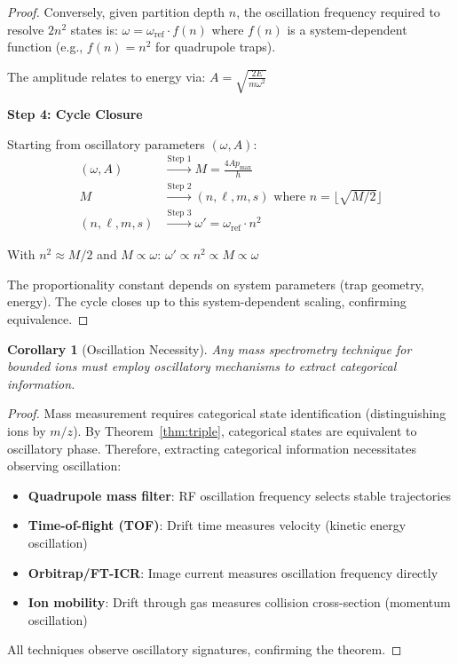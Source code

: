 \documentclass[twocolumn,10pt]{article}
\newtheorem{corollary}[theorem]{Corollary}
\begin{document}
\begin{proof}
Conversely, given partition depth $n$, the oscillation frequency required to resolve $2n^2$ states is:
$
\omega = \omega_{\mathrm{ref}} \cdot f(n)
$
where $f(n)$ is a system-dependent function (e.g., $f(n) = n^2$ for quadrupole traps).

The amplitude relates to energy via:
$
A = \sqrt{\frac{2E}{m\omega^2}}
$

\textbf{Step 4: Cycle Closure}

Starting from oscillatory parameters $(\omega, A)$:
\begin{align*}
(\omega, A) &\xrightarrow{\text{Step 1}} M = \frac{4Ap_{\max}}{h} \\
M &\xrightarrow{\text{Step 2}} (n, \ell, m, s) \text{ where } n = \lfloor\sqrt{M/2}\rfloor \\
(n, \ell, m, s) &\xrightarrow{\text{Step 3}} \omega' = \omega_{\mathrm{ref}} \cdot n^2
\end{align*}

With $n^2 \approx M/2$ and $M \propto \omega$:
$
\omega' \propto n^2 \propto M \propto \omega
$

The proportionality constant depends on system parameters (trap geometry, energy). The cycle closes up to this system-dependent scaling, confirming equivalence.
\end{proof}

\begin{corollary}[Oscillation Necessity]
\label{cor:oscillation}
Any mass spectrometry technique for bounded ions must employ oscillatory mechanisms to extract categorical information.
\end{corollary}

\begin{proof}
Mass measurement requires categorical state identification (distinguishing ions by $m/z$). By Theorem~\ref{thm:triple}, categorical states are equivalent to oscillatory phase. Therefore, extracting categorical information necessitates observing oscillation:
\begin{itemize}
    \item \textbf{Quadrupole mass filter}: RF oscillation frequency selects stable trajectories
    \item \textbf{Time-of-flight (TOF)}: Drift time measures velocity (kinetic energy oscillation)
    \item \textbf{Orbitrap/FT-ICR}: Image current measures oscillation frequency directly
    \item \textbf{Ion mobility}: Drift through gas measures collision cross-section (momentum oscillation)
\end{itemize}
All techniques observe oscillatory signatures, confirming the theorem.
\end{proof}
\end{document}
